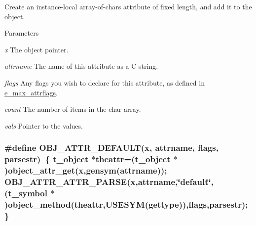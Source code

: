 Create an instance-\/local array-\/of-\/chars attribute of fixed length, and add it to the object. 
\begin{DoxyParams}{Parameters}
\item[{\em x}]The object pointer. \item[{\em attrname}]The name of this attribute as a C-\/string. \item[{\em flags}]Any flags you wish to declare for this attribute, as defined in \hyperlink{group__attr_gaf296cfc6741bb19207f6ed8062809115}{e\_\-max\_\-attrflags}. \item[{\em count}]The number of items in the char array. \item[{\em vals}]Pointer to the values. \end{DoxyParams}
\hypertarget{group__attr_ga00b1f956b36c49d4e2a286ec9aaec754}{
\subsubsection[{OBJ\_\-ATTR\_\-DEFAULT}]{\setlength{\rightskip}{0pt plus 5cm}\#define OBJ\_\-ATTR\_\-DEFAULT(x, \/  attrname, \/  flags, \/  parsestr)~\{ {\bf t\_\-object} $\ast$theattr=({\bf t\_\-object} $\ast$)object\_\-attr\_\-get(x,gensym(attrname)); OBJ\_\-ATTR\_\-ATTR\_\-PARSE(x,attrname,\char`\"{}default\char`\"{},(t\_\-symbol $\ast$)object\_\-method(theattr,USESYM(gettype)),flags,parsestr); \}}}
\label{group__attr_ga00b1f956b36c49d4e2a286ec9aaec754}


